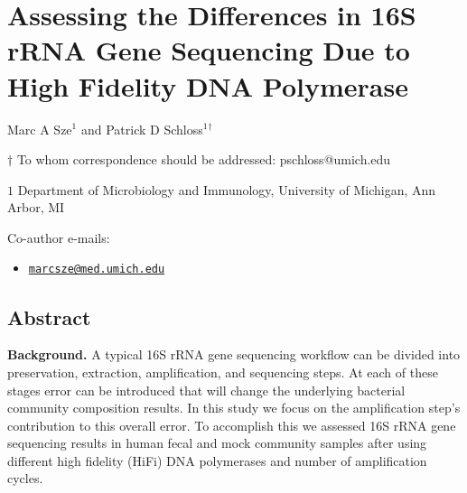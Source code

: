 \documentclass[11pt,]{article}
\title{}
\author{}
\date{}
\providecommand{\tightlist}{%
  \setlength{\itemsep}{0pt}\setlength{\parskip}{0pt}}
\begin{document}
\section{Assessing the Differences in 16S rRNA Gene Sequencing Due to
High Fidelity DNA
Polymerase}\label{assessing-the-differences-in-16s-rrna-gene-sequencing-due-to-high-fidelity-dna-polymerase}

\begin{center}
\vspace{25mm}

Marc A Sze${^1}$ and Patrick D Schloss${^1}$${^\dagger}$

\vspace{20mm}

$\dagger$ To whom correspondence should be addressed: pschloss@umich.edu

$1$ Department of Microbiology and Immunology, University of Michigan, Ann Arbor, MI




\end{center}

Co-author e-mails:

\begin{itemize}
\tightlist
\item
  \href{mailto:marcsze@med.umich.edu}{\nolinkurl{marcsze@med.umich.edu}}
\end{itemize}

\newpage

\linenumbers

\subsection{Abstract}\label{abstract}

\textbf{Background.} A typical 16S rRNA gene sequencing workflow can be
divided into preservation, extraction, amplification, and sequencing
steps. At each of these stages error can be introduced that will change
the underlying bacterial community composition results. In this study we
focus on the amplification step's contribution to this overall error. To
accomplish this we assessed 16S rRNA gene sequencing results in human
fecal and mock community samples after using different high fidelity
(HiFi) DNA polymerases and number of amplification cycles.
\end{document}
